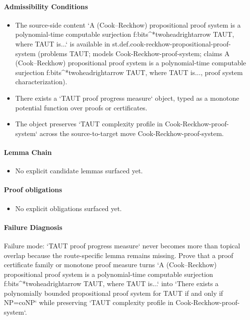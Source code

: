 \documentclass[11pt]{article}
\begin{document}
\paragraph{Admissibility Conditions}
\begin{itemize}
\item The source-side content `A (Cook--Reckhow) propositional proof system is a polynomial-time computable surjection f:bits\textasciicircum{}*twoheadrightarrow TAUT, where TAUT is...` is available in st.def.cook-reckhow-propositional-proof-system (problems TAUT; models Cook-Reckhow-proof-system; claims A (Cook--Reckhow) propositional proof system is a polynomial-time computable surjection f:bits\textasciicircum{}*twoheadrightarrow TAUT, where TAUT is..., proof system characterization).
\item There exists a `TAUT proof progress measure` object, typed as a monotone potential function over proofs or certificates.
\item The object preserves `TAUT complexity profile in Cook-Reckhow-proof-system` across the source-to-target move Cook-Reckhow-proof-system.
\end{itemize}
\paragraph{Lemma Chain}
\begin{itemize}
\item No explicit candidate lemmas surfaced yet.
\end{itemize}
\paragraph{Proof obligations}
\begin{itemize}
\item No explicit obligations surfaced yet.
\end{itemize}
\paragraph{Failure Diagnosis}
Failure mode: `TAUT proof progress measure` never becomes more than topical overlap because the route-specific lemma remains missing. Prove that a proof certificate family or monotone proof measure turns `A (Cook--Reckhow) propositional proof system is a polynomial-time computable surjection f:bits\textasciicircum{}*twoheadrightarrow TAUT, where TAUT is...` into `There exists a polynomially bounded propositional proof system for TAUT if and only if NP=coNP` while preserving `TAUT complexity profile in Cook-Reckhow-proof-system`.
\end{document}
